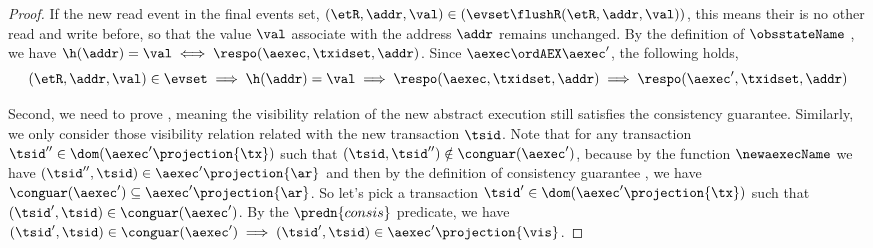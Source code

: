 \begin{proof}
    If the new read event in the final events set, \ie \( (\etR, \addr, \val) \in ( \evset \flushR (\etR, \addr, \val) ) \), this means their is no other read and write before, so that the value \( \val  \) associate with the address \( \addr \) remains unchanged.
    By the definition of \( \obsstateName \) ,  we have \( \h(\addr) = \val \iff \respo(\aexec, \txidset, \addr) \).
    Since \( \aexec \ordAEX \aexec' \), the following holds,
    \[
        (\etR, \addr, \val) \in \evset \implies \h(\addr) = \val \implies  \respo(\aexec, \txidset, \addr) \implies \respo(\aexec', \txidset, \addr)
    \]
    
    Second, we need to prove , meaning the visibility relation of the new abstract execution still satisfies the consistency guarantee.
    Similarly, we only consider those visibility relation related with the new transaction \( \tsid \).
    Note that for any transaction \( \tsid'' \in \dom(\aexec'\projection{\tx}) \) such that \( (\tsid, \tsid'') \notin \conguar(\aexec') \), because by the function \( \newaexecName \) we have \( (\tsid'', \tsid) \in \aexec'\projection{\ar} \) and then by the definition of consistency guarantee , we have \( \conguar(\aexec') \subseteq \aexec'\projection{\ar}\).
    So let's pick a transaction \( \tsid' \in \dom(\aexec'\projection{\tx}) \) such that \( (\tsid', \tsid) \in \conguar(\aexec') \).
    By the \( \predn{consis}\) predicate, we have \( (\tsid', \tsid) \in \conguar(\aexec') \implies (\tsid', \tsid) \in \aexec'\projection{\vis}\).
\end{proof}

